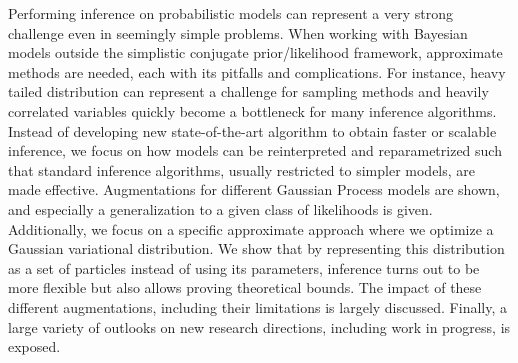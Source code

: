 
\ifCLASSINFOlangDE
{}
\fi

\begin{abstracts}        %
Performing inference on probabilistic models can represent a very strong challenge even in seemingly simple problems.
When working with Bayesian models outside the simplistic conjugate prior/likelihood framework, approximate methods are needed, each with its pitfalls and complications.
For instance, heavy tailed distribution can represent a challenge for sampling methods and heavily correlated variables quickly become a bottleneck for many inference algorithms.
Instead of developing new state-of-the-art algorithm to obtain faster or scalable inference, we focus on how models can be reinterpreted and reparametrized such that standard inference algorithms, usually restricted to simpler models, are made effective.
Augmentations for different Gaussian Process models are shown, and especially a generalization to a given class of likelihoods is given.
Additionally, we focus on a specific approximate approach where we optimize a Gaussian variational distribution.
We show that by representing this distribution as a set of particles instead of using its parameters, inference turns out to be more flexible but also allows proving theoretical bounds.
The impact of these different augmentations, including their limitations is largely discussed.
Finally, a large variety of outlooks on new research directions, including work in progress, is exposed.



\end{abstracts}
\ifCLASSINFOlangDE
{}
\fi

